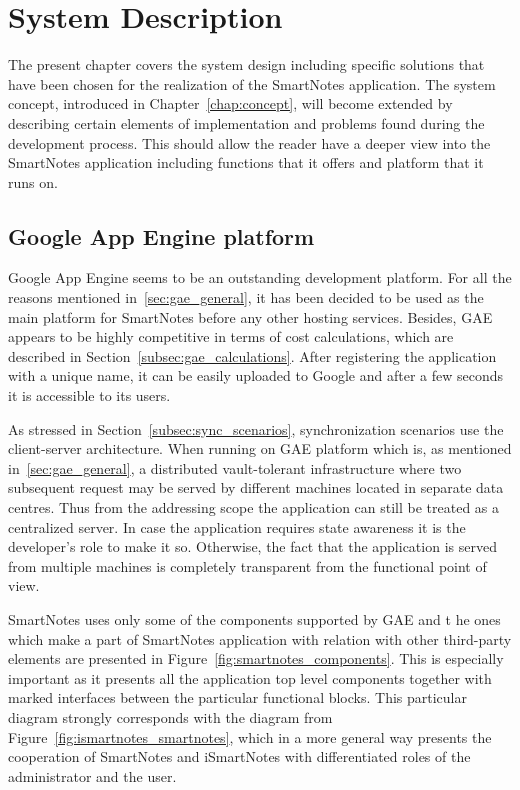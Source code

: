 \chapter{System Description}\label{chap:sys_description}
The present chapter covers the system design including specific solutions that have been chosen for the realization of the SmartNotes application. The system concept, introduced in Chapter~\ref{chap:concept}, will become extended by describing certain elements of implementation and problems found during the development process. This should allow the reader have a deeper view into the SmartNotes application including functions that it offers and platform that it runs on.
\section{Google App Engine platform}\label{sec:gae}
Google App Engine seems to be an outstanding development platform. For all the reasons mentioned in~\ref{sec:gae_general}, it has been decided to be used as the main platform for SmartNotes before any other hosting services. Besides, GAE appears to be highly competitive in terms of cost calculations, which are described in Section~\ref{subsec:gae_calculations}. After registering the application with a unique name, it can be easily uploaded to Google and after a few seconds it is accessible to its users.

As stressed in Section~\ref{subsec:sync_scenarios}, synchronization scenarios use the client-server architecture. When running on GAE platform which is, as mentioned in~\ref{sec:gae_general}, a distributed vault-tolerant infrastructure where two subsequent request may be served by different machines located in separate data centres. Thus from the addressing scope the application can still be treated as a centralized server. In case the application requires state awareness it is the developer's role to make it so. Otherwise, the fact that the application is served from multiple machines is completely transparent from the functional point of view.

SmartNotes uses only some of the components supported by GAE and t he ones which make a part of SmartNotes application with relation with other third-party elements are presented in Figure~\ref{fig:smartnotes_components}. This is especially important as it presents all the application top level components together with marked interfaces between the particular functional blocks. This particular diagram strongly corresponds with the diagram from Figure~\ref{fig:ismartnotes_smartnotes}, which in a more general way presents the cooperation of SmartNotes and iSmartNotes with differentiated roles of the administrator and the user. 

